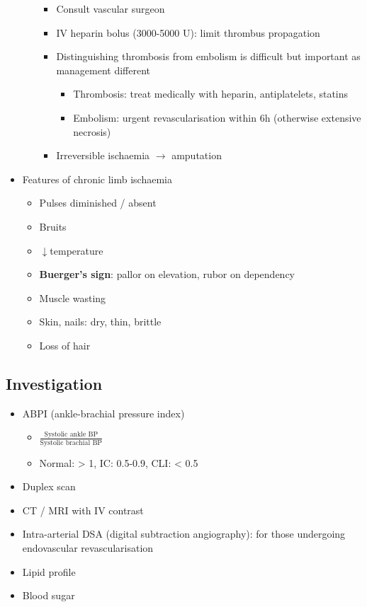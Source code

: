\documentclass[
  12pt,
]{memoir}
\providecommand{\tightlist}{%
  \setlength{\itemsep}{0pt}\setlength{\parskip}{0pt}}
\begin{document}
\begin{itemize}
\begin{itemize}
    \begin{itemize}
    \tightlist
    \item
      Consult vascular surgeon
    \item
      IV heparin bolus (3000-5000 U): limit thrombus propagation
    \item
      Distinguishing thrombosis from embolism is difficult but important
      as management different

      \begin{itemize}
      \tightlist
      \item
        Thrombosis: treat medically with heparin, antiplatelets, statins
      \item
        Embolism: urgent revascularisation within 6h (otherwise
        extensive necrosis)
      \end{itemize}
    \item
      Irreversible ischaemia \(\rightarrow\) amputation
    \end{itemize}
  \end{itemize}
\item
  Features of chronic limb ischaemia

  \begin{itemize}
  \tightlist
  \item
    Pulses diminished / absent
  \item
    Bruits
  \item
    \(\downarrow\)temperature
  \item
    \textbf{Buerger's sign}: pallor on elevation, rubor on dependency
  \item
    Muscle wasting
  \item
    Skin, nails: dry, thin, brittle
  \item
    Loss of hair
  \end{itemize}
\end{itemize}

\hypertarget{investigation-3}{%
\subsection{Investigation}\label{investigation-3}}

\begin{itemize}
\tightlist
\item
  ABPI (ankle-brachial pressure index)

  \begin{itemize}
  \tightlist
  \item
    \(\frac{\text{Systolic ankle BP}}{\text{Systolic brachial BP}}\)
  \item
    Normal: \textgreater{} 1, IC: 0.5-0.9, CLI: \textless{} 0.5
  \end{itemize}
\item
  Duplex scan
\item
  CT / MRI with IV contrast
\item
  Intra-arterial DSA (digital subtraction angiography): for those
  undergoing endovascular revascularisation
\item
  Lipid profile
\item
  Blood sugar
\end{itemize}
\end{document}
